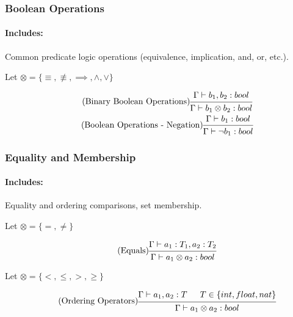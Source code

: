\documentclass{article}
\begin{document}
\subsubsection{Boolean Operations}
\paragraph{Includes:} Common predicate logic operations (equivalence, implication, and, or, etc.).

Let $\otimes = \{\equiv, \not\equiv, \implies, \land, \lor \}$

\begin{gather}
\tag{Binary Boolean Operations}
\begin{prooftree}
\hypo{\Gamma \vdash b_1, b_2: bool}
\infer1{\Gamma \vdash b_1 \otimes b_2 : bool}
\end{prooftree}
\\
\tag{Boolean Operations - Negation}
\begin{prooftree}
\hypo{\Gamma \vdash b_1: bool}
\infer1{\Gamma \vdash \lnot b_1 : bool}
\end{prooftree}
\end{gather}

\subsubsection{Equality and Membership}
\paragraph{Includes:} Equality and ordering comparisons, set membership.

Let $\otimes = \{=, \neq\}$

\begin{gather}
\tag{Equals}
\begin{prooftree}
\hypo{\Gamma \vdash a_1: T_1, a_2: T_2}
\infer1{\Gamma \vdash a_1 \otimes a_2 : bool}
\end{prooftree}
\end{gather}

Let $\otimes = \{<, \leq, >, \geq \}$

\begin{gather}
\tag{Ordering Operators}
\begin{prooftree}
\hypo{\Gamma \vdash a_1, a_2: T}
\hypo{T \in \{int, float, nat\}}
\infer2{\Gamma \vdash a_1 \otimes a_2 : bool}
\end{prooftree}
\end{gather}
\end{document}
